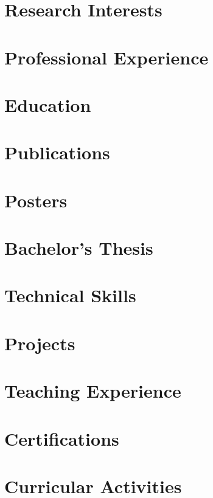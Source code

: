 \documentclass[10pt,a4paper,calibri]{moderncv}
\begin{document}
\makecvtitle{}
\vspace{-32pt}

\section{Research Interests}


\section{Professional Experience}


\section{Education}


\section{Publications}


\section{Posters}


\section{Bachelor's Thesis}


\section{Technical Skills}


\section{Projects}


\section{Teaching Experience}



\section{Certifications}


\section{Curricular Activities}

\end{document}

